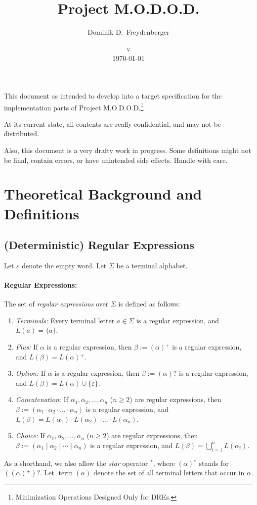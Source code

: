 \documentclass[a4paper,11pt, svgnames,titlepage]{article}
\date{v\svnfilerev\\ \today}
\title{Project M.O.D.O.D.}
\author{Dominik D.\ Freydenberger}
\newcommand{\rxp}{{^\mathtt{+}}}
\newcommand{\rxs}{{^\mathtt{*}}}
\newcommand{\rxo}{\mathtt{?}}
\newcommand{\rxc}{\cdot}
\DeclareMathOperator{\ror}{\mathtt{|}}
\newcommand{\emptyword}{\varepsilon}
\newcommand{\df}{:=}
\DeclareMathOperator{\term}{term}
\begin{document}
\maketitle
\pagestyle{fancy}

This document as intended to develop into a target specification for the implementation parts of Project M.O.D.O.D.\footnote{Minimization Operations Designed Only for DREs.}%

At its current state, all contents are really confidential, and may not be distributed.

Also, this document is a very drafty work in progress. Some definitions might not be final, contain errors, or have unintended side effects. Handle with care.
\section{Theoretical Background and Definitions}

\subsection{(Deterministic) Regular Expressions}\label{sec:dredef}
Let $\emptyword$ denote the empty word. Let $\Sigma$ be a terminal alphabet. 

\paragraph{Regular Expressions:} The set of \emph{regular expressions} over $\Sigma$ is defined as follows:
\begin{enumerate}
	\item \emph{Terminals:} Every terminal letter $a\in \Sigma$ is a regular expression, and $L(a)=\{a\}$.
	\item \emph{Plus:} If $\alpha$ is a regular expression, then $\beta\df(\alpha)\rxp$ is a regular expression, and $L(\beta)=L(\alpha)\rxp$.
	\item \emph{Option:} If $\alpha$ is a regular expression, then $\beta\df(\alpha)\rxo$ is a regular expression, and $L(\beta)=L(\alpha)\cup\{\emptyword\}$.
	\item \emph{Concatenation:} If $\alpha_1,\alpha_2,\ldots,\alpha_n$ ($n\geq 2$) are regular expressions, then $\beta\df(\alpha_1\rxc \alpha_2 \rxc \ldots \rxc \alpha_n)$ is a regular expression, and $L(\beta)=L(\alpha_1)\cdot L(\alpha_2)\cdot \ldots \cdot L(\alpha_n)$.
	\item \emph{Choice:} If $\alpha_1,\alpha_2,\ldots,\alpha_n$ ($n\geq 2$) are regular expressions, then $\beta\df(\alpha_1\ror \alpha_2 \ror \cdots \ror \alpha_n)$ is a regular expression, and $L(\beta)=\bigcup_{i=1}^{n} L(\alpha_i)$.
\end{enumerate}
As a shorthand, we also allow the \emph{star} operator $\rxs$, where $(\alpha)\rxs$ stands for $((\alpha)\rxp)\rxo$. Let $\term(\alpha)$ denote the set of all terminal letters that occur in $\alpha$.
\end{document}
